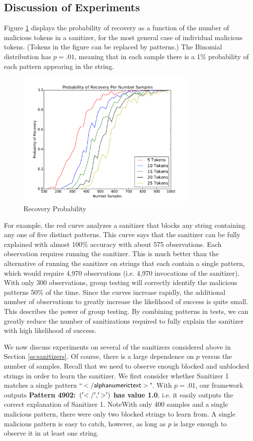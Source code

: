 \subsection{Discussion of Experiments}

Figure \ref{fig:recovery_probability} displays the probability of recovery as a function of the number of malicious tokens in a sanitizer, for the most general case of individual malicious tokens. (Tokens in the figure can be replaced by patterns.) The Binomial distribution has $p=.01$, meaning that in each sample there is a 1\% probability of each pattern appearing in the string.
\begin{figure}[!thb]
	\centering
	\includegraphics[width=3.5in]{./recovery_probability_per_samples.pdf}
	\caption{Recovery Probability}
	\label{fig:recovery_probability}
\end{figure}
For example, the red curve analyzes a sanitizer that blocks any string containing any one of five distinct patterns. This curve says that the sanitizer can be fully explained with almost 100\% accuracy with about 575 observations. Each observation requires running the sanitizer. This is much better than the alternative of running the sanitizer on strings that each contain a single pattern, which would require 4,970 observations (i.e. 4,970 invocations of the sanitizer). With only 300 observations, group testing will correctly identify the malicious patterns 50\% of the time. Since the curves increase rapidly, the additional number of observations to greatly increase the likelihood of success is quite small. This describes the power of group testing. By combining patterns in tests, we can greatly reduce the number of sanitizations required to fully explain the sanitizer with high likelihood of success.

We now discuss experiments on several of the sanitizers considered above in Section \ref{ss:sanitizers}. Of course, there is a large dependence on $p$ versus the number of samples. Recall that we need to observe enough blocked and unblocked strings in order to learn the sanitizer. We first consider whether Sanitizer 1 matches a single pattern ``$\sf{</alphanumerictext>}$". With $p=.01$, our framework outputs \textbf{Pattern 4902: $\sf{('</', '>')}$ has value 1.0}, i.e. it easily outputs the correct explanation of Sanitizer 1. NoteWith only 400 samples and a single malicious pattern, there were only two blocked strings to learn from.
A single malicious pattern is easy to catch, however, as long as $p$ is large enough to observe it in at least one string. 

